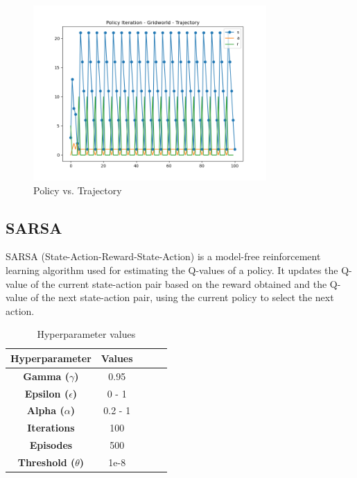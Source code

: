 \documentclass[conference]{IEEEtran}
\begin{document}
\begin{figure}[!htbp]
\centerline{\includegraphics[width=3.5in]{g_vi_policy_vs_trajec.png}}
\caption{Policy vs. Trajectory}
\label{fig}
\end{figure}
\FloatBarrier

\subsection{SARSA}

SARSA (State-Action-Reward-State-Action) is a model-free reinforcement learning algorithm used for estimating the Q-values of a policy. It updates the Q-value of the current state-action pair based on the reward obtained and the Q-value of the next state-action pair, using the current policy to select the next action. \cite{b1}

\begin{table}[h]
\caption{Hyperparameter values}
\renewcommand{\arraystretch}{1.5}
\centering
\begin{tabular}{|c|c|c|c|c|}
\hline
\textbf{Hyperparameter} &  \textbf{Values}  \\ \hline
\textbf{Gamma ($\gamma$)} & 0.95  \\ \hline
\textbf{Epsilon ($\epsilon$)} & 0 - 1  \\ \hline
\textbf{Alpha ($\alpha$)} & 0.2 - 1  \\ \hline
\textbf{Iterations} & 100 \\ \hline
\textbf{Episodes} & 500  \\ \hline
\textbf{Threshold ($\theta$)} & 1e-8 \\ \hline
\end{tabular} \\
\label{tab:hyperparameters}
\end{table}
\end{document}
